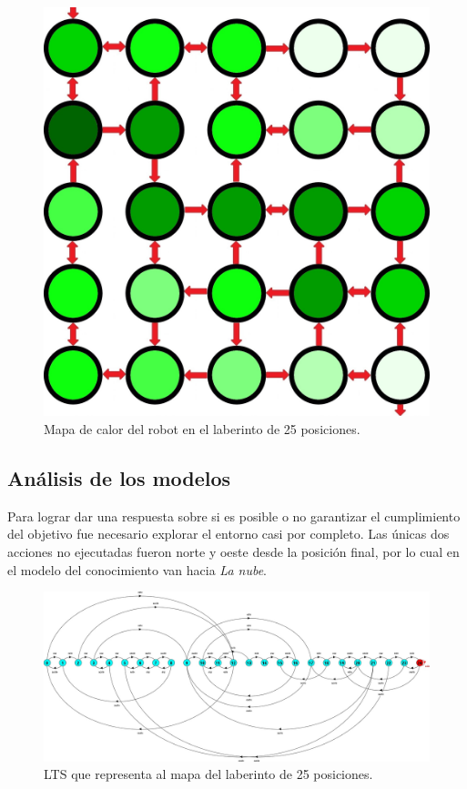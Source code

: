 \begin{figure}[H]
	\centering
		\includegraphics[scale=0.2]{Imagenes/Laberintos/25_calor.jpg}
	\caption{Mapa de calor del robot en el laberinto de 25 posiciones.}
	\label{fig:25_calor}
\end{figure}

\clearpage

\subsection{Análisis de los modelos}

Para lograr dar una respuesta sobre si es posible o no garantizar el cumplimiento del objetivo fue necesario 
explorar el entorno casi por completo. Las únicas dos acciones no ejecutadas fueron norte y oeste desde la posición 
final, por lo cual en el modelo del conocimiento van hacia \textit{La nube}.

\begin{figure}[H]
	\centering
		\includegraphics[width=1.0\textwidth]{Imagenes/Laberintos/25_view.jpg}
	\caption{LTS que representa al mapa del laberinto de 25 posiciones.}
	\label{fig:25_view}
\end{figure}

